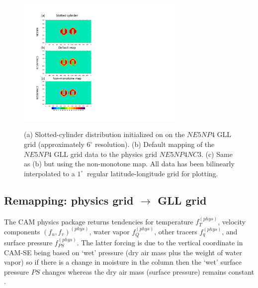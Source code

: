\begin{figure}[t]
\noindent\includegraphics[width=19pc,angle=0]{figs/idealized-mapping-tests-slotted-cylinder.pdf}\\
  \caption{(a) Slotted-cylinder distribution initialized on on the $NE5NP4$ GLL grid (approximately $6^\circ$ resolution). (b) Default mapping of the $NE5NP4$ GLL grid data to the physics grid $NE5NP4NC3$. (c) Same as (b) but using the non-monotone map. All data has been bilinearly interpolated to a $1^\circ\
$ regular latitude-longitude grid for plotting.}\label{fig:remap-slotted-cylinder}
\end{figure}
 
%
%
\subsection{Remapping: physics grid $\rightarrow$ GLL grid}
The CAM physics package returns tendencies for temperature $f_T^{(phys)}$, velocity components $(f_u,f_v)^{(phys)}$, water vapor $f_Q^{(phys)}$, other tracers $f_q^{(phys)}$, and surface pressure $f_{PS}^{(phys)}$. The latter forcing is due to the vertical coordinate in CAM-SE being based on `wet' pressure (dry air mass plus the weight of water vapor) so if there is a change in moisture in the column then the `wet' surface pressure  $PS$ changes whereas the dry air mass (surface pressure) remains constant \citep[see section 3.1.8 `Adjustment of pressure to include change in mass of water vapor' in ][]{CAM5}. 

